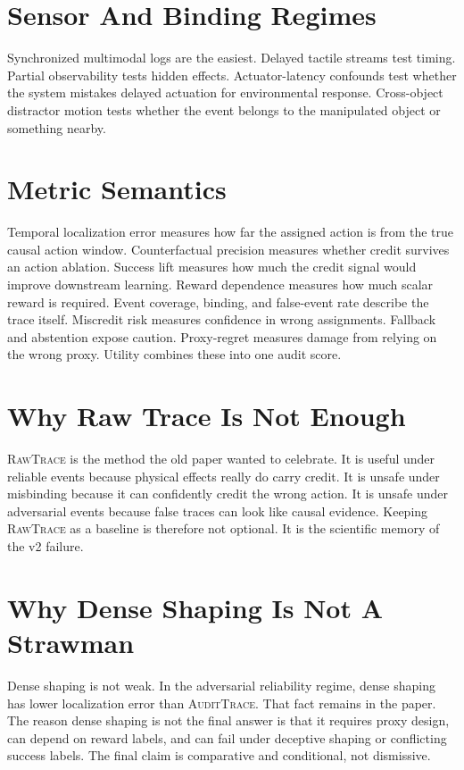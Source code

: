 \documentclass{article}
\newcommand{\method}{\textsc{AuditTrace}\xspace}
\newcommand{\rawtrace}{\textsc{RawTrace}\xspace}
\begin{document}
\section{Sensor And Binding Regimes}

Synchronized multimodal logs are the easiest. Delayed tactile streams test timing. Partial observability tests hidden effects. Actuator-latency confounds test whether the system mistakes delayed actuation for environmental response. Cross-object distractor motion tests whether the event belongs to the manipulated object or something nearby.

\section{Metric Semantics}

Temporal localization error measures how far the assigned action is from the true causal action window. Counterfactual precision measures whether credit survives an action ablation. Success lift measures how much the credit signal would improve downstream learning. Reward dependence measures how much scalar reward is required. Event coverage, binding, and false-event rate describe the trace itself. Miscredit risk measures confidence in wrong assignments. Fallback and abstention expose caution. Proxy-regret measures damage from relying on the wrong proxy. Utility combines these into one audit score.

\section{Why Raw Trace Is Not Enough}

\rawtrace is the method the old paper wanted to celebrate. It is useful under reliable events because physical effects really do carry credit. It is unsafe under misbinding because it can confidently credit the wrong action. It is unsafe under adversarial events because false traces can look like causal evidence. Keeping \rawtrace as a baseline is therefore not optional. It is the scientific memory of the v2 failure.

\section{Why Dense Shaping Is Not A Strawman}

Dense shaping is not weak. In the adversarial reliability regime, dense shaping has lower localization error than \method. That fact remains in the paper. The reason dense shaping is not the final answer is that it requires proxy design, can depend on reward labels, and can fail under deceptive shaping or conflicting success labels. The final claim is comparative and conditional, not dismissive.
\end{document}
